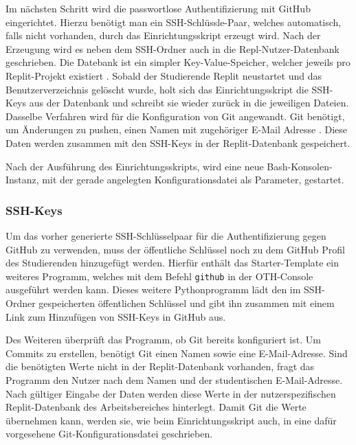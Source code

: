 Im nächsten Schritt wird die passwortlose Authentifizierung mit GitHub
eingerichtet. Hierzu benötigt man ein SSH-Schlüssle-Paar, welches automatisch,
falls nicht vorhanden, durch das Einrichtungsskript erzeugt wird. Nach der
Erzeugung wird es neben dem SSH-Ordner auch in die Repl-Nutzer-Datenbank
geschrieben. Die Datebank ist ein simpler Key-Value-Speicher, welcher jeweils
pro Replit-Projekt existiert \parencite{replit-database}. Sobald der Studierende
Replit neustartet und das Benutzerverzeichnis gelöscht wurde, holt sich das Einrichtungsskript die SSH-Keys aus der Datenbank und schreibt sie wieder
zurück in die jeweiligen Dateien. Dasselbe Verfahren wird für die Konfiguration
von Git angewandt. Git benötigt, um Änderungen zu pushen, einen Namen mit
zugehöriger E-Mail Adresse \parencite{git-config}. Diese Daten werden zusammen mit
den SSH-Keys in der Replit-Datenbank gespeichert.

Nach der Ausführung des Einrichtungsskripts, wird eine neue
Bash-Konsolen-Instanz, mit der gerade angelegten Konfigurationsdatei als
Parameter, gestartet.

\subsubsection{SSH-Keys}\label{replit-template-ssh-keys}
Um das vorher generierte SSH-Schlüsselpaar für die Authentifizierung gegen
GitHub zu verwenden, muss der öffentliche Schlüssel noch zu dem GitHub Profil
des Studierenden hinzugefügt werden. Hierfür enthält das Starter-Template ein
weiteres Programm, welches mit dem Befehl \texttt{github} in der OTH-Console
ausgeführt werden kann. Dieses weitere Pythonprogramm lädt den im SSH-Ordner
gespeicherten öffentlichen Schlüssel und gibt ihn zusammen mit einem Link
zum Hinzufügen von SSH-Keys in GitHub aus.

Des Weiteren überprüft das Programm, ob Git bereits konfiguriert ist. Um Commits
zu erstellen, benötigt Git einen Namen sowie eine E-Mail-Adresse. Sind die
benötigten Werte nicht in der Replit-Datenbank vorhanden, fragt das Programm den
Nutzer nach dem Namen und der studentischen E-Mail-Adresse. Nach gültiger
Eingabe der Daten werden diese Werte in der nutzerspezifischen Replit-Datenbank
des Arbeitsbereiches hinterlegt. Damit Git die Werte übernehmen kann, werden
sie, wie beim Einrichtungsskript auch, in eine dafür vorgesehene
Git-Konfigurationsdatei geschrieben.